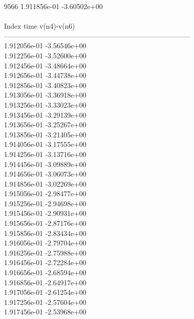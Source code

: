 9566	1.911856e-01	-3.60502e+00	\\ \hline
\\ \hline
Index   time            v(n4)-v(n6)     \\ \hline
--------------------------------------------------------------------------------\\ 	1.912056e-01	-3.56546e+00	\\ 	1.912256e-01	-3.52600e+00	\\ 	1.912456e-01	-3.48664e+00	\\ 	1.912656e-01	-3.44738e+00	\\ 	1.912856e-01	-3.40823e+00	\\ 	1.913056e-01	-3.36918e+00	\\ 	1.913256e-01	-3.33023e+00	\\ 	1.913456e-01	-3.29139e+00	\\ 	1.913656e-01	-3.25267e+00	\\ 	1.913856e-01	-3.21405e+00	\\ 	1.914056e-01	-3.17555e+00	\\ 	1.914256e-01	-3.13716e+00	\\ 	1.914456e-01	-3.09889e+00	\\ 	1.914656e-01	-3.06073e+00	\\ 	1.914856e-01	-3.02269e+00	\\ 	1.915056e-01	-2.98477e+00	\\ 	1.915256e-01	-2.94698e+00	\\ 	1.915456e-01	-2.90931e+00	\\ 	1.915656e-01	-2.87176e+00	\\ 	1.915856e-01	-2.83434e+00	\\ 	1.916056e-01	-2.79704e+00	\\ 	1.916256e-01	-2.75988e+00	\\ 	1.916456e-01	-2.72284e+00	\\ 	1.916656e-01	-2.68594e+00	\\ 	1.916856e-01	-2.64917e+00	\\ 	1.917056e-01	-2.61254e+00	\\ 	1.917256e-01	-2.57604e+00	\\ 	1.917456e-01	-2.53968e+00	\\ \hline
